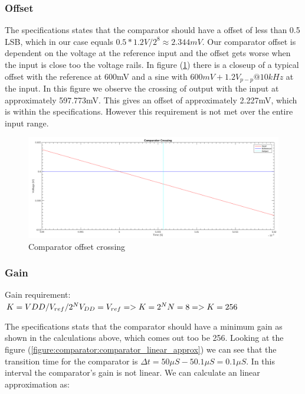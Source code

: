 \documentclass[english, 12pt, a4paper]{ifimaster}
\begin{document}
\subsubsection{Offset}
The specifications states that the comparator should have a offset of less than 0.5 LSB, which in our case equals \(0.5 * 1.2V/2^8 \approx 2.344mV\). 
Our comparator offset is dependent on the voltage at the reference input and the offset gets worse when the input is close too the voltage rails.
In figure (\ref{figure:comparator:comparator_crossing}) there is a closeup of a typical offset with the reference at 600mV and a sine with \(600mV +    1.2V_{p-p} @ 10kHz\) at the input. 
In this figure we observe the crossing of output with the input at approximately 597.773mV. This gives an offset of approximately 2.227mV, which is within the specifications. 
However this requirement is not met over the entire input range.

\begin{figure}[!ht]
    \centering
    \includegraphics[width=\textwidth]{img/comparator/comparator_crossing}
    \caption{Comparator offset crossing}
    \label{figure:comparator:comparator_crossing}
\end{figure}


\subsubsection{Gain}

Gain requirement: \\

\noindent
\begin{math}
K = VDD/V_{ref}/2^N \\
V_{DD} = V_{ref} => K = 2^N \\
N = 8 => K = 256 \\
\end{math}

\noindent
The specifications stats that the comparator should have a minimum gain as shown in the calculations above, which comes out too be 256.
Looking at the figure (\ref{figure:comparator:comparator_linear_approx}) we can see that the transition time for the comparator is \(\Delta t = 50\mu S - 50.1\mu S = 0.1\mu S \).
In this interval the comparator's gain is not linear. We can calculate an linear approximation as:
\end{document}

